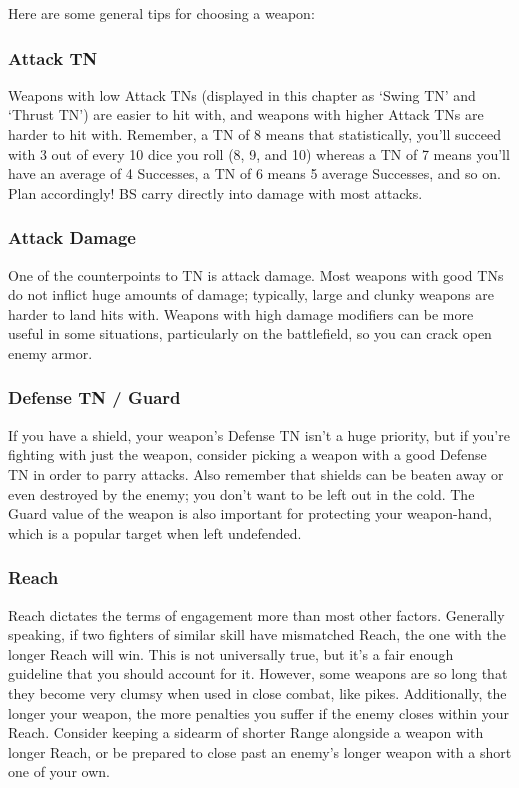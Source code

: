 \documentclass[oneside,11pt,english]{book}
\begin{document}
Here are some general tips for choosing a weapon:
\subsubsection{Attack TN}
Weapons with low Attack TNs (displayed in this chapter as ‘Swing TN’ and ‘Thrust TN’) are easier to hit with, and 
weapons with higher Attack TNs are harder to hit with. Remember, a TN of 8 means that statistically, you’ll succeed 
with 3 out of every 10 dice you roll (8, 9, and 10) whereas a TN of 7 means you’ll have an average of 4 Successes, a 
TN of 6 means 5 average Successes, and so on. Plan accordingly! BS carry directly into damage with most attacks.
\subsubsection{Attack Damage}
One of the counterpoints to TN is attack damage. Most weapons with good TNs do not inflict huge amounts of 
damage; typically, large and clunky weapons are harder to land hits with. Weapons with high damage modifiers can be
more useful in some situations, particularly on the battlefield, so you can crack open enemy armor.
\subsubsection{Defense TN / Guard}
If you have a shield, your weapon’s Defense TN isn’t a huge priority, but if you’re fighting with just the weapon, 
consider picking a weapon with a good Defense TN in order to parry attacks. Also remember that shields can be 
beaten away or even destroyed by the enemy; you don’t want to be left out in the cold. The Guard value of the weapon
is also important for protecting your weapon-hand, which is a popular target when left undefended.
\subsubsection{Reach}
Reach dictates the terms of engagement more than most other factors. Generally speaking, if two fighters of similar 
skill have mismatched Reach, the one with the longer Reach will win. This is not universally true, but it’s a fair 
enough guideline that you should account for it. However, some weapons are so long that they become very clumsy 
when used in close combat, like pikes. Additionally, the longer your weapon, the more penalties you suffer if the 
enemy closes within your Reach. Consider keeping a sidearm of shorter Range alongside a weapon with longer 
Reach, or be prepared to close past an enemy’s longer weapon with a short one of your own.
\end{document}
